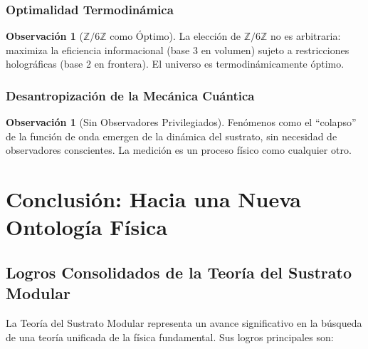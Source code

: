 \documentclass[11pt, a4paper]{article}
\theoremstyle{plain}
\theoremstyle{definition}
\newtheorem{observacion}[teorema]{Observación}
\newcommand{\Zmod}{\mathbb{Z}/6\mathbb{Z}}
\begin{document}
\subsubsection{Optimalidad Termodinámica}
\begin{observacion}[$\Zmod$ como Óptimo]
La elección de $\Zmod$ no es arbitraria: maximiza la eficiencia informacional (base 3 en volumen) sujeto a restricciones holográficas (base 2 en frontera). El universo es termodinámicamente óptimo.
\end{observacion}

\subsubsection{Desantropización de la Mecánica Cuántica}
\begin{observacion}[Sin Observadores Privilegiados]
Fenómenos como el ``colapso'' de la función de onda emergen de la dinámica del sustrato, sin necesidad de observadores conscientes. La medición es un proceso físico como cualquier otro.
\end{observacion}


\section{Conclusión: Hacia una Nueva Ontología Física}
\label{sec:conclusion}

\subsection{Logros Consolidados de la Teoría del Sustrato Modular}

La Teoría del Sustrato Modular representa un avance significativo en la búsqueda de una teoría unificada de la física fundamental. Sus logros principales son:
\end{document}
